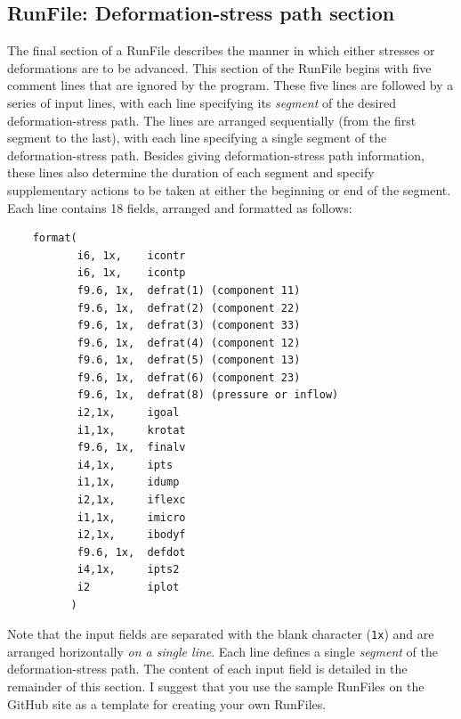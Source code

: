 \documentclass[letterpaper,11pt]{article}
\newcommand{\RunFile}{\textsf{RunFile}}
\begin{document}
\subsection{\textsf{RunFile}: Deformation-stress path section}%
\label{sec:runfile2}
The final section of a \textsf{RunFile} describes the manner in which
either stresses or deformations are to be advanced.
This section of the \textsf{RunFile}
begins with five comment lines that are ignored by the
program.
These five lines are followed by a series of input lines, 
with each line specifying
its \emph{segment} of the desired deformation-stress path.
The lines are arranged sequentially (from the first
segment to the last), with each
line specifying a single segment of the deformation-stress path.
Besides giving 
deformation-stress path information, these lines also 
determine the duration of each segment and
specify supplementary actions to be taken at 
either the beginning or end of the segment.
Each line contains 18 fields, arranged and formatted as follows:
\begin{verbatim}
    format(       
           i6, 1x,    icontr
           i6, 1x,    icontp
           f9.6, 1x,  defrat(1) (component 11)
           f9.6, 1x,  defrat(2) (component 22)
           f9.6, 1x,  defrat(3) (component 33)
           f9.6, 1x,  defrat(4) (component 12)
           f9.6, 1x,  defrat(5) (component 13)
           f9.6, 1x,  defrat(6) (component 23)
           f9.6, 1x,  defrat(8) (pressure or inflow)
           i2,1x,     igoal
           i1,1x,     krotat
           f9.6, 1x,  finalv
           i4,1x,     ipts
           i1,1x,     idump
           i2,1x,     iflexc
           i1,1x,     imicro
           i2,1x,     ibodyf
           f9.6, 1x,  defdot
           i4,1x,     ipts2
           i2         iplot
          )
\end{verbatim}
Note that the input fields are separated with the blank character
(\texttt{1x}) and are arranged horizontally \emph{on a single line}.
Each line defines a single \emph{segment} of the deformation-stress path.
The content of each input field is detailed in the remainder of this section.
I suggest that you use the sample \RunFile s on the GitHub site
as a template for creating your own \RunFile s.
%
\end{document}
